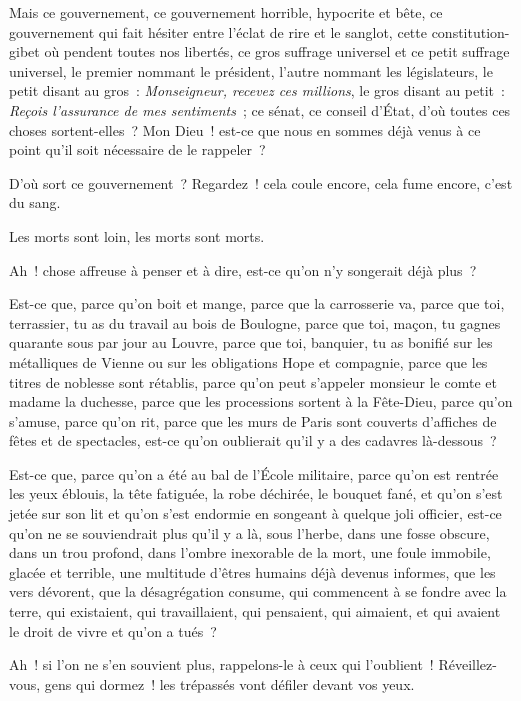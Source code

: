 \documentclass[french,twoside]{book} %
\begin{document}
\noindent Mais ce gouvernement, ce gouvernement horrible, hypocrite et bête, ce gouvernement qui fait hésiter entre l’éclat de rire et le sanglot, cette constitution-gibet où pendent toutes nos libertés, ce gros suffrage universel et ce petit suffrage universel, le premier nommant le président, l’autre nommant les législateurs, le petit disant au gros : \emph{Monseigneur, recevez ces millions}, le gros disant au petit : \emph{Reçois l’assurance de mes sentiments} ; ce sénat, ce conseil d’État, d’où toutes ces choses sortent-elles ? Mon Dieu ! est-ce que nous en sommes déjà venus à ce point qu’il soit nécessaire de le rappeler ?\par
D’où sort ce gouvernement ? Regardez ! cela coule encore, cela fume encore, c’est du sang.\par
Les morts sont loin, les morts sont morts.\par
Ah ! chose affreuse à penser et à dire, est-ce qu’on n’y songerait déjà plus ?\par
Est-ce que, parce qu’on boit et mange, parce que la carrosserie va, parce que toi, terrassier, tu as du travail au bois de Boulogne, parce que toi, maçon, tu gagnes quarante sous par jour au Louvre, parce que toi, banquier, tu as bonifié sur les métalliques de Vienne ou sur les obligations Hope et compagnie, parce que les titres de noblesse sont rétablis, parce qu’on peut s’appeler monsieur le comte et madame la duchesse, parce que les processions sortent à la Fête-Dieu, parce qu’on s’amuse, parce qu’on rit, parce que les murs de Paris sont couverts d’affiches de fêtes et de spectacles, est-ce qu’on oublierait qu’il y a des cadavres là-dessous ?\par
Est-ce que, parce qu’on a été au bal de l’École militaire, parce qu’on est rentrée les yeux éblouis, la tête fatiguée, la robe déchirée, le bouquet fané, et qu’on s’est jetée sur son lit et qu’on s’est endormie en songeant à quelque joli officier, est-ce qu’on ne se souviendrait plus qu’il y a là, sous l’herbe, dans une fosse obscure, dans un trou profond, dans l’ombre inexorable de la mort, une foule immobile, glacée et terrible, une multitude d’êtres humains déjà devenus informes, que les vers dévorent, que la désagrégation consume, qui commencent à se fondre avec la terre, qui existaient, qui travaillaient, qui pensaient, qui aimaient, et qui avaient le droit de vivre et qu’on a tués ?\par
Ah ! si l’on ne s’en souvient plus, rappelons-le à ceux qui l’oublient ! Réveillez-vous, gens qui dormez ! les trépassés vont défiler devant vos yeux.\par
\end{document}
